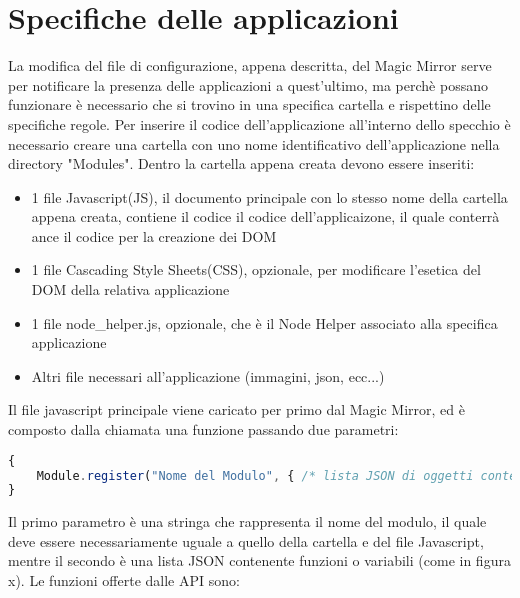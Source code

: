 \section{Specifiche delle applicazioni}
La modifica del file di configurazione, appena descritta, del Magic Mirror serve per notificare la presenza delle applicazioni a quest'ultimo,
ma perch\`e possano funzionare \`e necessario che si trovino in una specifica cartella e rispettino delle specifiche regole.
Per inserire il codice dell'applicazione all'interno dello specchio \`e necessario creare una cartella con uno nome identificativo dell'applicazione
nella directory "Modules".
Dentro la cartella appena creata devono essere inseriti:
\begin{itemize}
\item 1 file Javascript(JS), il documento principale con lo stesso nome della cartella appena creata, contiene il codice il codice dell'applicaizone, il quale
conterr\`a ance il codice per la creazione dei DOM
\item 1 file Cascading Style Sheets(CSS), opzionale, per modificare l'esetica del DOM della relativa applicazione
\item 1 file node\_helper.js, opzionale, che \`e il Node Helper associato alla specifica applicazione
\item Altri file necessari all'applicazione (immagini, json, ecc...)\\[1\baselineskip]
\end{itemize}
Il file javascript principale viene caricato per primo dal Magic Mirror, ed \`e composto dalla chiamata una funzione passando due parametri:
\begin{lstlisting}[language=JavaScript]
{
	Module.register("Nome del Modulo", { /* lista JSON di oggetti contenenti funzioni o variabili */});
}
\end{lstlisting}
Il primo parametro \`e una stringa che rappresenta il nome del modulo, il quale deve essere necessariamente uguale a quello della cartella e del file Javascript,
mentre il secondo \`e una lista JSON contenente funzioni o variabili (come in figura x).
Le funzioni offerte dalle API sono:
